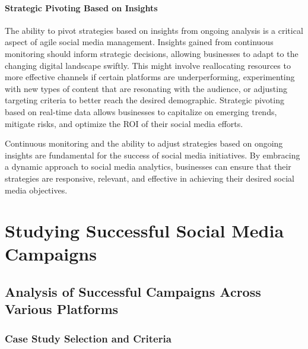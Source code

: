 \documentclass[
]{book}
\begin{document}
\hypertarget{strategic-pivoting-based-on-insights}{%
\subsubsection*{Strategic Pivoting Based on Insights}\label{strategic-pivoting-based-on-insights}}

The ability to pivot strategies based on insights from ongoing analysis is a critical aspect of agile social media management. Insights gained from continuous monitoring should inform strategic decisions, allowing businesses to adapt to the changing digital landscape swiftly. This might involve reallocating resources to more effective channels if certain platforms are underperforming, experimenting with new types of content that are resonating with the audience, or adjusting targeting criteria to better reach the desired demographic. Strategic pivoting based on real-time data allows businesses to capitalize on emerging trends, mitigate risks, and optimize the ROI of their social media efforts.

Continuous monitoring and the ability to adjust strategies based on ongoing insights are fundamental for the success of social media initiatives. By embracing a dynamic approach to social media analytics, businesses can ensure that their strategies are responsive, relevant, and effective in achieving their desired social media objectives.

\hypertarget{studying-successful-social-media-campaigns}{%
\chapter{Studying Successful Social Media Campaigns}\label{studying-successful-social-media-campaigns}}

\hypertarget{analysis-of-successful-campaigns-across-various-platforms}{%
\section*{Analysis of Successful Campaigns Across Various Platforms}\label{analysis-of-successful-campaigns-across-various-platforms}}

\hypertarget{case-study-selection-and-criteria}{%
\subsection{Case Study Selection and Criteria}\label{case-study-selection-and-criteria}}
\end{document}
